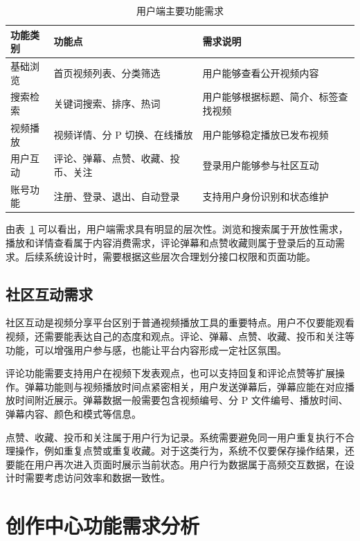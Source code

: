 \begin{table}[htbp]
  \centering
  \caption{用户端主要功能需求}
  \label{tab:user-main-functions}
  \begin{tabular}{p{}p{}p{}}
    \hline
    \textbf{功能类别} & \textbf{功能点} & \textbf{需求说明} \\
    \hline
    基础浏览 & 首页视频列表、分类筛选 & 用户能够查看公开视频内容 \\
    搜索检索 & 关键词搜索、排序、热词 & 用户能够根据标题、简介、标签查找视频 \\
    视频播放 & 视频详情、分 P 切换、在线播放 & 用户能够稳定播放已发布视频 \\
    用户互动 & 评论、弹幕、点赞、收藏、投币、关注 & 登录用户能够参与社区互动 \\
    账号功能 & 注册、登录、退出、自动登录 & 支持用户身份识别和状态维护 \\
    \hline
  \end{tabular}
\end{table}

由表~\ref{tab:user-main-functions} 可以看出，用户端需求具有明显的层次性。浏览和搜索属于开放性需求，播放和详情查看属于内容消费需求，评论弹幕和点赞收藏则属于登录后的互动需求。后续系统设计时，需要根据这些层次合理划分接口权限和页面功能。

\subsection{社区互动需求}
\label{subsec:interaction-requirements}

社区互动是视频分享平台区别于普通视频播放工具的重要特点。用户不仅要能观看视频，还需要能表达自己的态度和观点。评论、弹幕、点赞、收藏、投币和关注等功能，可以增强用户参与感，也能让平台内容形成一定社区氛围。

评论功能需要支持用户在视频下发表观点，也可以支持回复和评论点赞等扩展操作。弹幕功能则与视频播放时间点紧密相关，用户发送弹幕后，弹幕应能在对应播放时间附近展示。弹幕数据一般需要包含视频编号、分 P 文件编号、播放时间、弹幕内容、颜色和模式等信息。

点赞、收藏、投币和关注属于用户行为记录。系统需要避免同一用户重复执行不合理操作，例如重复点赞或重复收藏。对于这类行为，系统不仅要保存操作结果，还要能在用户再次进入页面时展示当前状态。用户行为数据属于高频交互数据，在设计时需要考虑访问效率和数据一致性。

\section{创作中心功能需求分析}
\label{sec:creator-center-requirements}

